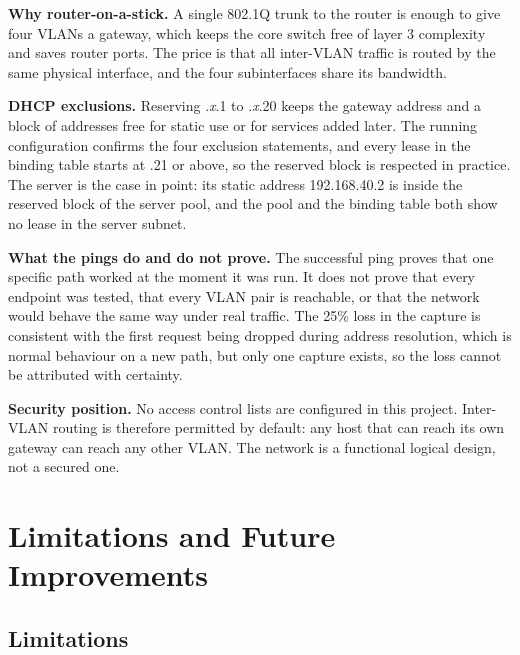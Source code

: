 \documentclass[11pt,a4paper]{article}
\begin{document}
\noindent
\textbf{Why router-on-a-stick.} A single 802.1Q trunk to the router is enough to give
four VLANs a gateway, which keeps the core switch free of layer 3 complexity and saves
router ports. The price is that all inter-VLAN traffic is routed by the same physical
interface, and the four subinterfaces share its bandwidth.

\noindent
\textbf{DHCP exclusions.} Reserving .\textit{x}.1 to .\textit{x}.20 keeps the gateway
address and a block of addresses free for static use or for services added later. The
running configuration confirms the four exclusion statements, and every lease in the
binding table starts at .21 or above, so the reserved block is respected in practice.
The server is the case in point: its static address 192.168.40.2 is inside the reserved
block of the server pool, and the pool and the binding table both show no lease in the
server subnet.

\noindent
\textbf{What the pings do and do not prove.} The successful ping proves that one
specific path worked at the moment it was run. It does not prove that every endpoint
was tested, that every VLAN pair is reachable, or that the network would behave the
same way under real traffic. The 25\% loss in the capture is consistent with the
first request being dropped during address resolution, which is normal behaviour on a
new path, but only one capture exists, so the loss cannot be attributed with certainty.

\noindent
\textbf{Security position.} No access control lists are configured in this project.
Inter-VLAN routing is therefore permitted by default: any host that can reach its own
gateway can reach any other VLAN. The network is a functional logical design, not a
secured one.

\section{Limitations and Future Improvements}
\label{sec:limitations}

\subsection{Limitations}
\end{document}
